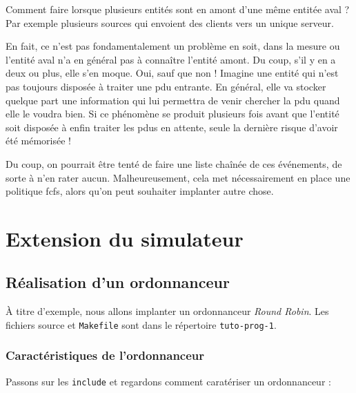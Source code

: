 \documentclass{article}
\begin{document}
   Comment faire lorsque plusieurs entités sont en amont d'une même
entitée aval ? Par exemple plusieurs sources qui envoient des clients
vers un unique serveur.

   En fait, ce n'est pas fondamentalement un problème en soit, dans la
mesure ou l'entité aval n'a en général pas à connaître l'entité
amont. Du coup, s'il y en a deux ou plus, elle s'en moque. Oui, sauf
que non ! Imagine une entité qui n'est pas toujours disposée à traiter
une {\sc pdu} entrante. En général, elle va stocker quelque part une
information qui lui permettra de venir chercher la {\sc pdu} quand
elle le voudra bien. Si ce phénomène se produit plusieurs fois avant
que l'entité soit disposée à enfin traiter les {\sc pdu}s en attente,
seule la dernière risque d'avoir été mémorisée !

   Du coup, on pourrait être tenté de faire une liste chaînée de ces 
événements, de sorte à n'en rater aucun. Malheureusement, cela met
nécessairement en place une politique {\sc fcfs}, alors qu'on peut
souhaiter implanter autre chose.

%
\section{Extension du simulateur}
\label{section:extension}


%
\subsection{Réalisation d'un ordonnanceur}
\label{subsection:tut-ordo}

   À titre d'exemple, nous allons implanter un ordonnanceur {\em Round
Robin}. Les fichiers source et {\tt Makefile} sont dans le
répertoire {\tt tuto-prog-1}.

%
\subsubsection{Caractéristiques de l'ordonnanceur}

   Passons sur les {\tt include} et regardons comment caratériser un
ordonnanceur :
\end{document}

